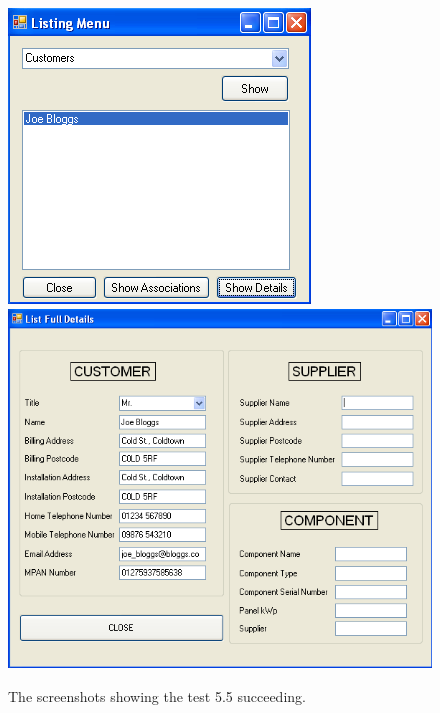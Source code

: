 \begin{figure}[ht]
\centering
\includegraphics[scale=0.5]{test5dot5scrot1}
\includegraphics[scale=0.5]{test5dot5scrot2}
\caption{The screenshots showing the test 5.5 succeeding.}
\label{fig:test_fivedotfive}
\end{figure}

